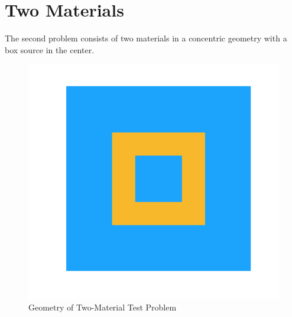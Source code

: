 \section{Two Materials}
The second problem consists of two materials in a concentric geometry with a box source in the center. 
\begin{figure}
    \centering
    \includegraphics[width=.3\textwidth]{fig/Geometry.png}
    \caption{Geometry of Two-Material Test Problem}
    \label{fig:test_geometry}
\end{figure}